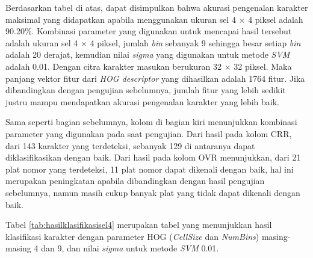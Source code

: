 \noindent Berdasarkan tabel di atas, dapat disimpulkan bahwa akurasi pengenalan karakter maksimal yang didapatkan apabila menggunakan ukuran sel 4 $\times$ 4 piksel adalah 90.20\%. Kombinasi parameter yang digunakan untuk mencapai hasil tersebut adalah ukuran sel 4 $\times$ 4 piksel, jumlah \textit{bin} sebanyak 9 sehingga besar setiap \textit{bin} adalah 20 derajat, kemudian nilai \textit{sigma} yang digunakan untuk metode \textit{SVM} adalah 0.01. Dengan citra karakter masukan berukuran 32 $\times$ 32 piksel. Maka panjang vektor fitur dari \textit{HOG descriptor} yang dihasilkan adalah 1764 fitur. Jika dibandingkan dengan pengujian sebelumnya, jumlah fitur yang lebih sedikit justru mampu mendapatkan akurasi pengenalan karakter yang lebih baik.

\noindent Sama seperti bagian sebelumnya, kolom di bagian kiri menunjukkan kombinasi parameter yang digunakan pada saat pengujian. Dari hasil pada kolom CRR, dari 143 karakter yang terdeteksi, sebanyak 129 di antaranya dapat diklasifikasikan dengan baik. Dari hasil pada kolom OVR menunjukkan, dari 21 plat nomor yang terdeteksi, 11 plat nomor dapat dikenali dengan baik, hal ini merupakan peningkatan apabila dibandingkan dengan hasil pengujian sebelumnya, namun masih cukup banyak plat yang tidak dapat dikenali dengan baik. 

\noindent Tabel \ref{tab:hasilklasifikasisel4} merupakan tabel yang menunjukkan hasil klasifikasi karakter dengan parameter HOG (\textit{CellSize} dan \textit{NumBins}) masing-masing 4 dan 9, dan nilai \textit{sigma} untuk metode \textit{SVM} 0.01.

